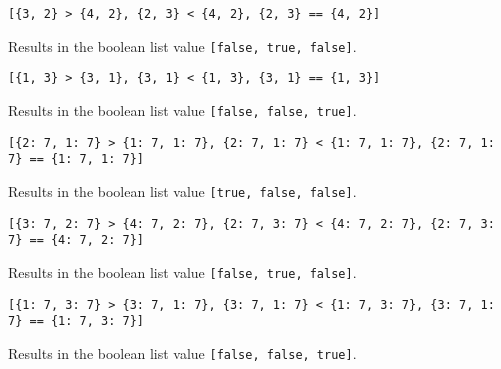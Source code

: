 {\begin{itemize}
{		\item[] \texttt{[\{3, 2\} > \{4, 2\}, \{2, 3\} < \{4, 2\}, \{2, 3\} == \{4, 2\}]}
		
			Results in the boolean list value \texttt{[false, true, false]}.
			
		\item[] \texttt{[\{1, 3\} > \{3, 1\}, \{3, 1\} < \{1, 3\}, \{3, 1\} == \{1, 3\}]}
		
			Results in the boolean list value \texttt{[false, false, true]}.
			
		\item[] \texttt{[\{2: 7, 1: 7\} > \{1: 7, 1: 7\}, \{2: 7, 1: 7\} < \{1: 7, 1: 7\}, \{2: 7, 1: 7\} == \{1: 7, 1: 7\}]}
		
			Results in the boolean list value \texttt{[true, false, false]}.
			
		\item[] \texttt{[\{3: 7, 2: 7\} > \{4: 7, 2: 7\}, \{2: 7, 3: 7\} < \{4: 7, 2: 7\}, \{2: 7, 3: 7\} == \{4: 7, 2: 7\}]}
		
			Results in the boolean list value \texttt{[false, true, false]}.
			
		\item[] \texttt{[\{1: 7, 3: 7\} > \{3: 7, 1: 7\}, \{3: 7, 1: 7\} < \{1: 7, 3: 7\}, \{3: 7, 1: 7\} == \{1: 7, 3: 7\}]}
		
			Results in the boolean list value \texttt{[false, false, true]}.
	}
	\end{itemize}
}



















